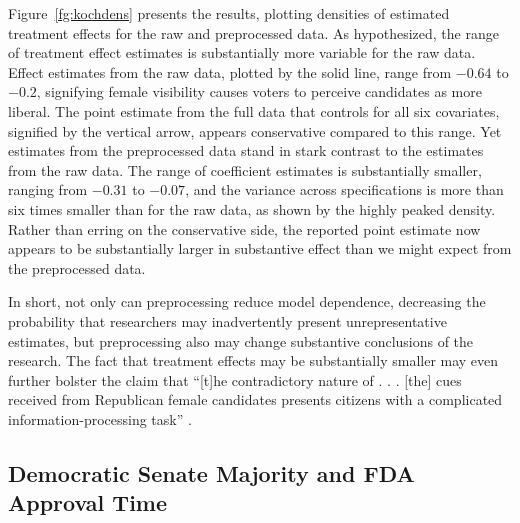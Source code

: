 \documentclass[11pt,titlepage]{article}
\begin{document}
Figure~\ref{fg:kochdens} presents the results, plotting densities of
estimated treatment effects for the raw and preprocessed data.  As
hypothesized, the range of treatment effect estimates is substantially
more variable for the raw data.  Effect estimates from the raw data, plotted by the
solid line, range from $-0.64$ to $-0.2$, signifying female visibility
causes voters to perceive candidates as more liberal.  The point
estimate from the full data that controls for all six covariates,
signified by the vertical arrow, appears conservative compared to this
range.  Yet estimates from the preprocessed data stand in stark
contrast to the estimates from the raw data.  The range of coefficient
estimates is substantially smaller, ranging from $-0.31$ to $-0.07$,
and the variance across specifications is more than six times smaller
than for the raw data, as shown by the highly peaked density.  Rather
than erring on the conservative side, the reported point estimate now
appears to be substantially larger in substantive effect than we might
expect from the preprocessed data.

In short, not only can preprocessing reduce model dependence,
decreasing the probability that researchers may inadvertently present
unrepresentative estimates, but preprocessing also may change
substantive conclusions of the research.  The fact that treatment
effects may be substantially smaller may even further bolster the
claim that ``[t]he contradictory nature of . . . [the] cues received
from Republican female candidates presents citizens with a complicated
information-processing task'' \citep[p. 460]{Koch02}.

\subsection{Democratic Senate Majority and FDA Approval Time}
\end{document}
